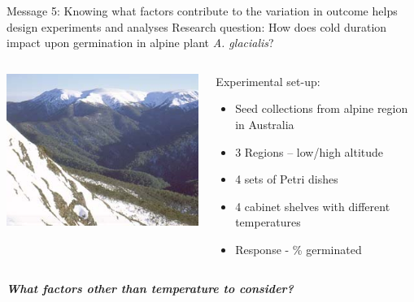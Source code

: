 \documentclass[10pt]{beamer}
\begin{document}
\begin{frame}{Message 5: Knowing what factors contribute to the variation in outcome helps design experiments and analyses}
 \pause
 Research question: 
How does cold duration impact upon germination in alpine plant \textit{A. glacialis}?

  \begin{columns}
    \begin{column}{0.4\textwidth}
	\begin{center}
	\includegraphics[width=\textwidth]{Figures/message5}
	\end{center}
    \end{column}
    
    \begin{column}{0.6\textwidth}
    \begin{block}{Experimental set-up:}
      \begin{itemize}
	\item Seed collections from alpine region in Australia
	\item 3 Regions -- low/high altitude
	\item 4 sets of Petri dishes
	\item 4 cabinet shelves with different temperatures
	\item Response - \% germinated
      \end{itemize}
      \end{block}
    \end{column}
  \end{columns}
   \vspace{0.1cm}
  \textbf{\emph{What factors other than temperature to consider? }}
\end{frame}
\end{document}
